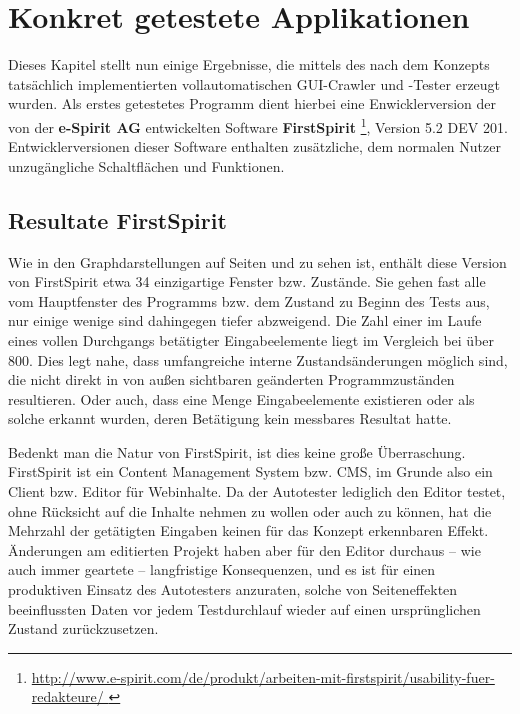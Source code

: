 \chapter{Konkret getestete Applikationen}\label{chapter:concretetests}


Dieses Kapitel stellt nun einige Ergebnisse, die mittels des nach dem Konzepts tatsächlich
implementierten vollautomatischen GUI-Crawler und -Tester erzeugt wurden.
Als erstes getestetes Programm dient hierbei eine Enwicklerversion der von der
\textbf{e-Spirit AG} entwickelten Software \textbf{FirstSpirit} 
\footnote{\url{ http://www.e-spirit.com/de/produkt/arbeiten-mit-firstspirit/usability-fuer-redakteure/ }},
Version 5.2 DEV 201. Entwicklerversionen dieser Software enthalten zusätzliche,
dem normalen Nutzer unzugängliche Schaltflächen und Funktionen.


\section{Resultate FirstSpirit}\label{section:testresults}

Wie in den Graphdarstellungen auf Seiten \pageref{fig:model_firstspirit_notext} und 
\pageref{fig:model_freespirit_06.10.2015} zu sehen ist, enthält diese Version von
FirstSpirit etwa 34 einzigartige Fenster bzw. Zustände. Sie gehen fast alle vom
Hauptfenster des Programms bzw. dem Zustand zu Beginn des Tests aus,
nur einige wenige sind dahingegen tiefer abzweigend. Die Zahl einer im
Laufe eines vollen Durchgangs betätigter Eingabeelemente liegt im Vergleich bei
über 800. Dies legt nahe, dass umfangreiche interne Zustandsänderungen
möglich sind, die nicht direkt in von außen sichtbaren geänderten
Programmzuständen resultieren. Oder auch, dass eine Menge Eingabeelemente
existieren oder als solche erkannt wurden, deren Betätigung kein messbares
Resultat hatte.

Bedenkt man die Natur von FirstSpirit, ist dies keine große Überraschung.
FirstSpirit ist ein Content Management System bzw. CMS, im Grunde also
ein Client bzw. Editor für Webinhalte. Da der Autotester lediglich den Editor testet,
ohne Rücksicht auf die Inhalte nehmen zu wollen oder auch zu können,
hat die Mehrzahl der getätigten Eingaben keinen für das Konzept erkennbaren
Effekt. Änderungen am editierten Projekt haben aber für den Editor durchaus
-- wie auch immer geartete -- langfristige Konsequenzen, und es ist für
einen produktiven Einsatz des Autotesters anzuraten, solche von Seiteneffekten
beeinflussten Daten vor jedem Testdurchlauf wieder auf einen ursprünglichen
Zustand zurückzusetzen.

